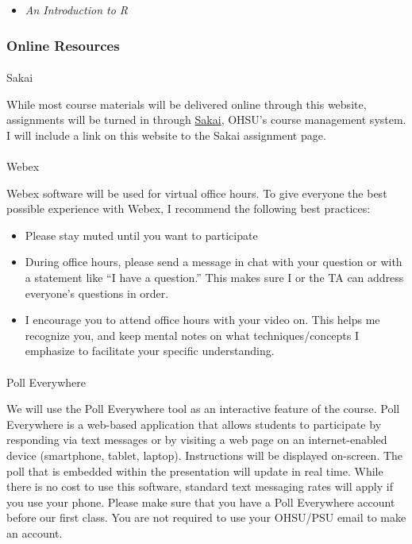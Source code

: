 \documentclass[
  letterpaper,
  DIV=11,
  numbers=noendperiod]{scrartcl}
\makeatletter
\let\oldparagraph\paragraph
\renewcommand{\paragraph}{
    \@ifstar
      \xxxParagraphStar
      \xxxParagraphNoStar
  }
\newcommand{\xxxParagraphStar}[1]{\oldparagraph*{#1}\mbox{}}
\newcommand{\xxxParagraphNoStar}[1]{\oldparagraph{#1}\mbox{}}
\providecommand{\tightlist}{%
  \setlength{\itemsep}{0pt}\setlength{\parskip}{0pt}}\usepackage{longtable,booktabs,array}
\makeatother
\begin{document}
\begin{itemize}
\tightlist
\item
  \emph{An Introduction to R}
\end{itemize}

\subsubsection{Online Resources}\label{online-resources}

\paragraph{Sakai}\label{sakai}

While most course materials will be delivered online through this
website, assignments will be turned in through
\href{https://sakai.ohsu.edu/}{Sakai}, OHSU's course management system.
I will include a link on this website to the Sakai assignment page.~

\paragraph{Webex}\label{webex}

Webex software will be used for virtual office hours. To give everyone
the best possible experience with Webex, I recommend the following best
practices:

\begin{itemize}
\tightlist
\item
  Please stay muted until you want to participate
\item
  During office hours, please send a message in chat with your question
  or with a statement like ``I have a question.'' This makes sure I or
  the TA can address everyone's questions in order.~
\item
  I encourage you to attend office hours with your video on. This helps
  me recognize you, and keep mental notes on what techniques/concepts I
  emphasize to facilitate your specific understanding.~
\end{itemize}

\paragraph{Poll Everywhere}\label{poll-everywhere}

We will use the Poll Everywhere tool as an interactive feature of the
course. Poll Everywhere is a web-based application that allows students
to participate by responding via text messages or by visiting a web page
on an internet-enabled device (smartphone, tablet, laptop). Instructions
will be displayed on-screen. The poll that is embedded within the
presentation will update in real time. While there is no cost to use
this software, standard text messaging rates will apply if you use your
phone. Please make sure that you have a Poll Everywhere account before
our first class. You are not required to use your OHSU/PSU email to make
an account.~
\end{document}
